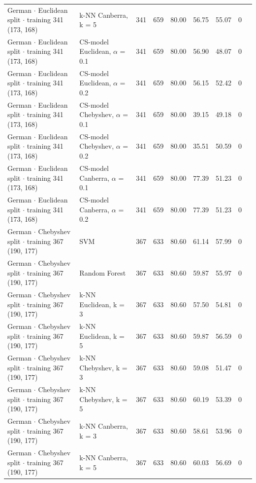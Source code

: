 \begin{longtable}{llrrrrrrl}
  German $\cdot$ Euclidean split $\cdot$ training 341 (173, 168) & k-NN Canberra, k = 5 & 341 & 659 & 80.00 & 56.75 & 55.07 & 0 &  \\
  German $\cdot$ Euclidean split $\cdot$ training 341 (173, 168) & CS-model Euclidean, $\alpha$ = 0.1 & 341 & 659 & 80.00 & 56.90 & 48.07 & 0 &  \\
  German $\cdot$ Euclidean split $\cdot$ training 341 (173, 168) & CS-model Euclidean, $\alpha$ = 0.2 & 341 & 659 & 80.00 & 56.15 & 52.42 & 0 &  \\
  German $\cdot$ Euclidean split $\cdot$ training 341 (173, 168) & CS-model Chebyshev, $\alpha$ = 0.1 & 341 & 659 & 80.00 & 39.15 & 49.18 & 0 &  \\
  German $\cdot$ Euclidean split $\cdot$ training 341 (173, 168) & CS-model Chebyshev, $\alpha$ = 0.2 & 341 & 659 & 80.00 & 35.51 & 50.59 & 0 &  \\
  German $\cdot$ Euclidean split $\cdot$ training 341 (173, 168) & CS-model Canberra, $\alpha$ = 0.1 & 341 & 659 & 80.00 & 77.39 & 51.23 & 0 &  \\
  German $\cdot$ Euclidean split $\cdot$ training 341 (173, 168) & CS-model Canberra, $\alpha$ = 0.2 & 341 & 659 & 80.00 & 77.39 & 51.23 & 0 &  \\
  German $\cdot$ Chebyshev split $\cdot$ training 367 (190, 177) & SVM & 367 & 633 & 80.60 & 61.14 & 57.99 & 0 &  \\
  German $\cdot$ Chebyshev split $\cdot$ training 367 (190, 177) & Random Forest & 367 & 633 & 80.60 & 59.87 & 55.97 & 0 &  \\
  German $\cdot$ Chebyshev split $\cdot$ training 367 (190, 177) & k-NN Euclidean, k = 3 & 367 & 633 & 80.60 & 57.50 & 54.81 & 0 &  \\
  German $\cdot$ Chebyshev split $\cdot$ training 367 (190, 177) & k-NN Euclidean, k = 5 & 367 & 633 & 80.60 & 59.87 & 56.59 & 0 &  \\
  German $\cdot$ Chebyshev split $\cdot$ training 367 (190, 177) & k-NN Chebyshev, k = 3 & 367 & 633 & 80.60 & 59.08 & 51.47 & 0 &  \\
  German $\cdot$ Chebyshev split $\cdot$ training 367 (190, 177) & k-NN Chebyshev, k = 5 & 367 & 633 & 80.60 & 60.19 & 53.39 & 0 &  \\
  German $\cdot$ Chebyshev split $\cdot$ training 367 (190, 177) & k-NN Canberra, k = 3 & 367 & 633 & 80.60 & 58.61 & 53.96 & 0 &  \\
  German $\cdot$ Chebyshev split $\cdot$ training 367 (190, 177) & k-NN Canberra, k = 5 & 367 & 633 & 80.60 & 60.03 & 56.69 & 0 &  \\

\end{longtable}
